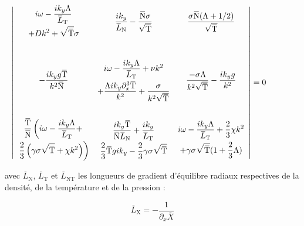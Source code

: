 \begin{refsection}
\begin{equation}\mkern-60mu
\label{2-dispersion}
\left|\begin{array}{ccc}
\begin{gathered}
i\omega
-\dfrac{ik_y\Lambda}{\overbar{L}_{\text{T}}}\\+Dk^2+\sqrt{\overbar{\text{T}}}\sigma
\end{gathered}
&
\dfrac{ik_y}{\overbar{L}_\text{N}}-\dfrac{\overbar{\text{N}}\sigma}{\sqrt{\overbar{\text{T}}}}
&
\dfrac{\sigma\overbar{\text{N}}(\Lambda+1/2)}{\sqrt{\overbar{\text{T}}}}
\\[4em]
-\dfrac{ik_yg\overbar{\text{T}}}{k^2\overbar{\text{N}}} 
& \begin{gathered}
i\omega-\dfrac{ik_y\Lambda}{\overbar{L}_\text{T}}+\nu
k^2\\+\dfrac{\Lambda
ik_y\partial_x^3\overbar{\text{T}}}{k ^2}+\dfrac{\sigma}{k^2\sqrt{\overbar{\text{T}}}} \end{gathered}
&
\dfrac{-\sigma\Lambda}{k^2\sqrt{\overbar{\text{T}}}}-\dfrac{ik_yg}{k^2}
\\[4em]
\begin{gathered}
\dfrac{\overbar{\text{T}}}{\overbar{\text{N}}}\left(i\omega-\dfrac{ik_y\Lambda}{\overbar{L}_\text{T}}+\right.\\
\left.\dfrac{2}{3}\left(\gamma\sigma\sqrt{\overbar{\text{T}}}+\chi
k^2\right)\right)\end{gathered}
&
\begin{gathered}
\dfrac{ik_y\overbar{\text{T}}}{\overbar{\text{N}}\overbar{L}_\text{N}}+\dfrac{ik_y}{\overbar{L}_\text{T}}\\
\dfrac{2}{3}\overbar{\text{T}}gik_y-\dfrac{2}{3}\gamma\sigma\sqrt{\overbar{\text{T}}}
\end{gathered}
&
\begin{gathered}
i\omega-\dfrac{ik_y\Lambda}{\overbar{L}_\text{T}}+\dfrac{2}{3}\chi
k^2\\
+\gamma\sigma\sqrt{\overbar{\text{T}}}(1+\dfrac{2}{3}\Lambda)
\end{gathered}

\end{array}\right|=0\\[3ex]
\end{equation}

 avec $\overbar{L}_\text{N}$, $\overbar{L}_\text{T}$ et
 $\overbar{L}_\text{NT}$ les longueurs de gradient d'équilibre radiaux respectives de la densité, de la
 température et de la pression :
 
 \begin{equation}
 \overbar{L}_\text{X}=-\frac{1}{\partial_x\overbar{X}}
 \end{equation}
 

\end{refsection}
